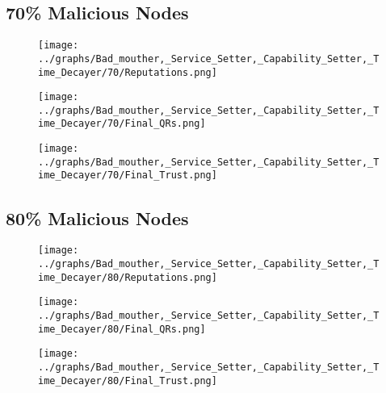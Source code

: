 \documentclass{article}
\begin{document}
  \begin{minipage}[t]{0.49\columnwidth}
    \subsection*{70\% Malicious Nodes}
        \begin{figure}[H]
            \centering
            \texttt{[image: ../graphs/Bad\_mouther,\_Service\_Setter,\_Capability\_Setter,\_Time\_Decayer/70/Reputations.png]}
        \end{figure}
        \begin{figure}[H]
            \centering
            \texttt{[image: ../graphs/Bad\_mouther,\_Service\_Setter,\_Capability\_Setter,\_Time\_Decayer/70/Final\_QRs.png]}
        \end{figure}
    \end{minipage}
    \begin{minipage}[t]{0.49\columnwidth}
        \begin{figure}[H]
            \centering
            \texttt{[image: ../graphs/Bad\_mouther,\_Service\_Setter,\_Capability\_Setter,\_Time\_Decayer/70/Final\_Trust.png]}
        \end{figure}
    \end{minipage}

  \begin{minipage}[t]{0.49\columnwidth}
    \subsection*{80\% Malicious Nodes}
        \begin{figure}[H]
            \centering
            \texttt{[image: ../graphs/Bad\_mouther,\_Service\_Setter,\_Capability\_Setter,\_Time\_Decayer/80/Reputations.png]}
        \end{figure}
        \begin{figure}[H]
            \centering
            \texttt{[image: ../graphs/Bad\_mouther,\_Service\_Setter,\_Capability\_Setter,\_Time\_Decayer/80/Final\_QRs.png]}
        \end{figure}
    \end{minipage}
    \begin{minipage}[t]{0.49\columnwidth}
        \begin{figure}[H]
            \centering
            \texttt{[image: ../graphs/Bad\_mouther,\_Service\_Setter,\_Capability\_Setter,\_Time\_Decayer/80/Final\_Trust.png]}
        \end{figure}
    \end{minipage}
\end{document}
